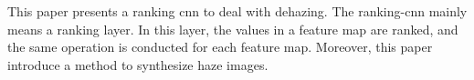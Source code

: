\documentclass[10pt,onecolumn]{book}
\begin{document}
This paper presents a ranking cnn to deal with dehazing. The ranking-cnn mainly means a ranking layer. In this layer, the values in a feature map are ranked, and the same operation is conducted for each feature map. Moreover, this paper introduce a method to synthesize haze images.

{\small


}
\end{document}
